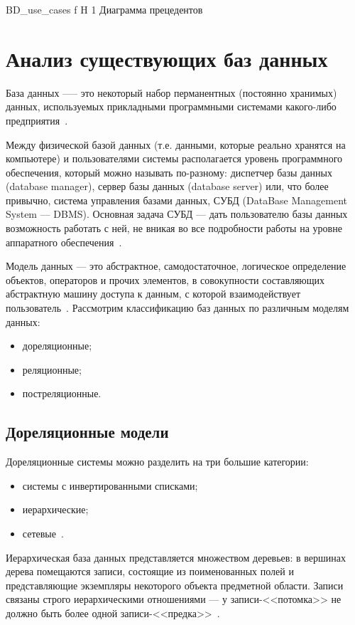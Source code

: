 {BD_use_cases} %
{f} %
{H} %
{1\textwidth} %
{Диаграмма прецедентов} %


\section{Анализ существующих баз данных}
База данных —-- это некоторый набор перманентных (постоянно хранимых) данных, используемых прикладными программными системами какого-либо предприятия~\cite{williams-db}.

Между физической базой данных (т.е. данными, которые реально хранятся на компьютере) и пользователями системы располагается уровень программного
обеспечения, который можно называть по-разному: диспетчер базы данных (database 
manager), сервер базы данных (database server) или, что более привычно, система управления базами данных, СУБД (DataBase Management System — DBMS).
Основная задача СУБД --- дать пользователю базы данных возможность работать с ней, не вникая во все подробности работы на уровне аппаратного обеспечения~\cite{williams-db}.

Модель данных — это абстрактное, самодостаточное, логическое определение объектов, операторов и прочих элементов, в совокупности составляющих абстрактную машину доступа к данным, с которой взаимодействует пользователь~\cite{williams-db}.
Рассмотрим классификацию баз данных по различным моделям данных:
\begin{itemize}
	\item дореляционные;
	\item реляционные;
	\item постреляционные.
\end{itemize}

\subsection{Дореляционные модели}
Дореляционные системы можно разделить на три большие категории:
\begin{itemize}
	\item системы с инвертированными списками;
	\item иерархические;
	\item сетевые~\cite{williams-db}.
\end{itemize}
Иерархическая база данных представляется множеством 
деревьев: в вершинах дерева помещаются записи, состоящие из поименованных 
полей и представляющие экземпляры некоторого объекта предметной области. 
Записи связаны строго иерархическими отношениями --- у записи-<<потомка>> не 
должно быть более одной записи-<<предка>>~\cite{wolf-db}.

